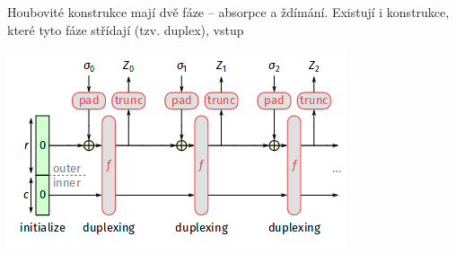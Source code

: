Houbovité konstrukce mají dvě fáze -- absorpce a ždímání. Existují i konstrukce, které tyto fáze střídají (tzv. duplex), vstup

\begin{center}
	\includegraphics[width=\linewidth]{duplex.png}
\end{center}